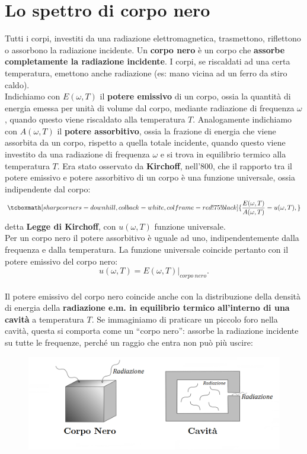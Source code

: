 \documentclass[a4paper,12pt,oneside]{book}
\begin{document}
\section{Lo spettro di corpo nero}
Tutti i corpi, investiti da una radiazione elettromagnetica, trasmettono, riflettono o assorbono la radiazione incidente. Un \textbf{corpo nero} è un corpo che \textbf{assorbe completamente la radiazione incidente}. I corpi, se riscaldati ad una certa temperatura, emettono anche radiazione (es: mano vicina ad un ferro da stiro caldo).\\

Indichiamo con $E(\omega , T) $ il \textbf{potere emissivo} di un corpo, ossia la quantità di energia emessa per unità di volume dal corpo, mediante radiazione di frequenza $\omega$, quando questo viene riscaldato alla temperatura $T$. Analogamente indichiamo con $A(\omega , T )$ il \textbf{potere assorbitivo}, ossia la frazione di energia che viene assorbita da un corpo, rispetto a quella totale incidente, quando questo viene investito da una radiazione di frequenza $\omega$ e si trova in equilibrio termico alla temperatura  $T$.
Era stato osservato da \textbf{Kirchoff}, nell'800, che il rapporto tra il potere emissivo e potere assorbitivo di un corpo è una funzione universale, ossia indipendente dal corpo:
	\begin{equation}
		\tcboxmath[sharp corners=downhill ,colback=white,colframe=red!75!black]{
			\frac{E(\omega ,T)}{A(\omega ,T)}= u(\omega , T),
		}
	\end{equation}
detta \textbf{Legge di Kirchoff}, con $u(\omega , T)$ funzione universale.\\

Per un corpo nero il potere assorbitivo è uguale ad uno, indipendentemente dalla frequenza e dalla temperatura. La funzione universale coincide pertanto con il potere emissivo del corpo nero:
	\begin{equation}
		u(\omega, T)= E(\omega , T)|_{corpo\ nero}.
	\end{equation}\\
	
Il potere emissivo del corpo nero coincide anche con la distribuzione della densità di energia della \textbf{radiazione e.m. in equilibrio termico all'interno di una cavità} a temperatura $T$. Se immaginiamo di praticare un piccolo foro nella cavità, questa si comporta come un ``corpo nero'': assorbe la radiazione incidente su tutte le frequenze, perché un raggio che entra non può più uscire:\\
	\begin{figure}[!htbp]
		\includegraphics[width=\textwidth]{immagini/cap_1/fig_1_1.png}
	\end{figure}
	
\end{document}
